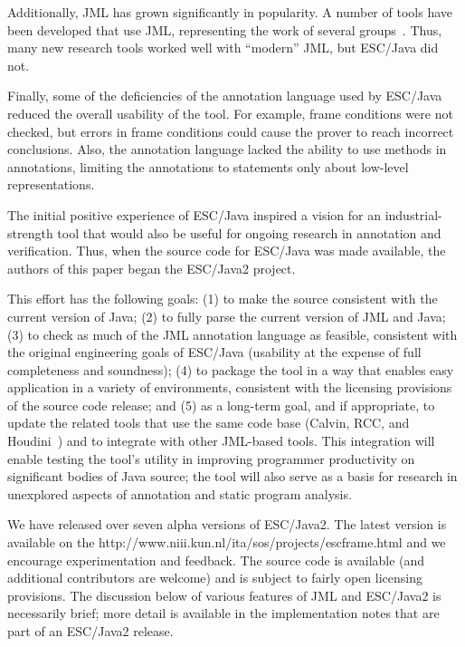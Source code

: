 \documentclass{llncs}
\begin{document}
Additionally, JML has grown significantly in popularity.  A number of
tools have been developed that use JML, representing the work of
several
groups~\cite{jmlpapers,Burdy-etal03, Leavens-etal00, NimmerErnst01,Bogor03}.
Thus, many new research tools worked well with ``modern'' JML, but
ESC/Java did not.

Finally, some of the deficiencies of the annotation language used by
ESC/Java reduced the overall usability of the tool.  For example,
frame conditions were not checked, but errors in frame conditions
could cause the prover to reach incorrect conclusions.  Also, the
annotation language lacked the ability to use methods in annotations,
limiting the annotations to statements only about low-level
representations.

The initial positive experience of ESC/Java inspired a vision for an
industrial-strength tool that would also be useful for ongoing
research in annotation and verification.  Thus, when the source code
for ESC/Java was made available, the authors of this paper began the
ESC/Java2 project.

This effort has the following goals:
(1) to make the source consistent with the current version of Java;
(2) to fully parse the current version of JML and Java;
(3) to check as much of the JML annotation language as feasible,
consistent with the original engineering goals of ESC/Java
(usability at the expense of full completeness and soundness);
(4) to package the tool in a way that enables easy application in a
variety of environments, consistent with the licensing provisions of
the source code release; and
(5) as a long-term goal, and if appropriate, to update the related
tools that use the same code base (Calvin, RCC, and
Houdini~\cite{flanagan01houdini}) and to integrate with other
JML-based tools.  This integration will enable testing the tool's
utility in improving programmer productivity on significant bodies of
Java source; the tool will also serve as a basis for research in
unexplored aspects of annotation and static program analysis.
  
We have released over seven alpha versions of ESC/Java2.  The latest
version is available on the 
{http://www.niii.kun.nl/ita/sos/projects/escframe.html} and we
encourage experimentation and feedback.  The source code is available
(and additional contributors are welcome) and is subject to fairly
open licensing provisions.  The discussion below of various features
of JML and ESC/Java2 is necessarily brief; more detail is available in
the implementation notes that are part of an ESC/Java2 release.
\end{document}
